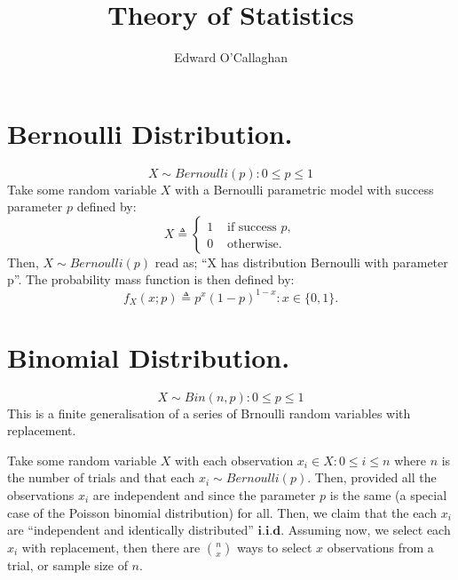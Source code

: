 \documentclass[10pt, oneside, reqno]{amsart}
\title{Theory of Statistics}                 %
\author{Edward O'Callaghan}
\date{}                                      %
\begin{document}
\maketitle \tableofcontents \clearpage

\section{Bernoulli Distribution.}
\begin{equation}\label{eqn:bernoullidist}
 \boxed{X \sim Bernoulli (p) : 0 \leq p \leq 1}
\end{equation}
Take some random variable $X$ with a Bernoulli parametric model with success parameter $p$ defined by:
\begin{displaymath}
   X \triangleq \left\{
     \begin{array}{lr}
       1 & \mbox{ if success } p, \\
       0 & \mbox{ otherwise.}
     \end{array}
   \right.
\end{displaymath} 
Then, $X \sim Bernoulli (p)$ read as; ``X has distribution Bernoulli with parameter p''.
The probability mass function is then defined by:
\begin{equation}\label{eqn:bernoulli}
 \boxed{f_{X}(x; p) \triangleq p^{x}(1 - p)^{1 - x} : x \in \{0, 1\}.}
\end{equation}

\section{Binomial Distribution.}
\begin{equation}\label{eqn:bindist}
 \boxed{X \sim Bin(n, p) : 0 \leq p \leq 1}
\end{equation}
This is a finite generalisation of a series of Brnoulli random variables with replacement.

Take some random variable $X$ with each observation $x_{i} \in X : 0 \leq i \leq n$ where $n$ is the number of trials and that each $x_{i} \sim Bernoulli (p)$.
Then, provided all the observations $x_{i}$ are independent and since the parameter $p$ is the same (a special case of the Poisson binomial distribution) for all.
Then, we claim that the each $x_{i}$ are ``independent and identically distributed'' $\textbf{i.i.d}$.
Assuming now, we select each $x_{i}$ with replacement, then there are $n \choose x$ ways to select $x$ observations from a trial, or sample size of $n$.
\end{document}
